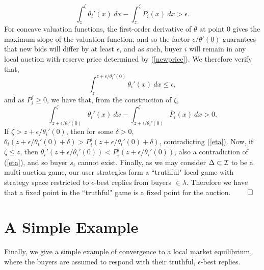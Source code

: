 {$$
    \int_z^{\zeta} {\theta_i}'(x) \ dx-\int_z^{\zeta} \bar{P}_i(x) \ dx > \epsilon.
$$
For concave valuation functions, the first-order derivative of $\theta$ at point
$0$ gives the maximum slope of the valuation function, and so the factor $\epsilon
/ \theta'(0)$ guarantees that new bids will differ by at least
$\epsilon$, and as such, buyer $i$ will remain in
any local auction with reserve price determined by (\ref{newprice}). We therefore
verify that,
$$
    \displaystyle\int_{z}^{z +\epsilon / \theta_i'(0)} \theta_i'(x) \
dx \le \epsilon,
$$
and as $P_i^j \ge 0$, we have that, from the construction of $\zeta$,
$$
    \displaystyle\int_{z+\epsilon / \theta_i'(0)}^\zeta \theta_i'(x) \ dx -
\int_{z+\epsilon / \theta_i'(0)}^\zeta \bar{P}_i(x) \ dx > 0.
$$
If $\zeta > z + \epsilon / \theta_i'(0)$, then for some $\delta >0$,
$\theta_i(z+\epsilon / \theta_i'(0)+\delta) > P_i^j(z+\epsilon /
\theta_i'(0)+\delta)$, contradicting (\ref{eta}).
Now, if $\zeta \le z$, then $\theta_i'(z+\epsilon / \theta_i'(0)) < P_i^j(z+\epsilon /
\theta_i'(0))$, also a contradiction of (\ref{eta}), and so buyer $s_i$ cannot
exist.
Finally, as we may consider $\Delta \subset \mathcal{I}$ to be a
multi-auction game, our user strategies form a ``truthful" local game 
with strategy space restricted to $\epsilon$-best replies from buyers $\in
\lambda$. Therefore we have that a fixed point in the ``truthful" game is a fixed point for the auction. 
$\qed$}



\section{A Simple Example}
\example
Finally, we give a simple example of convergence to a local market equilibrium,
where the buyers are assumed to respond with their truthful,
$\epsilon$-best replies.


